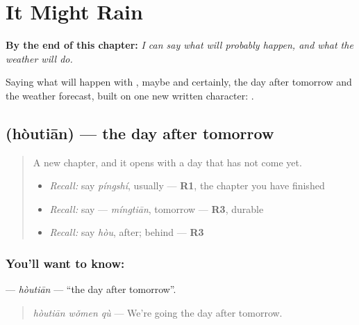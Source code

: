 
\chapter{It Might Rain}
\label{ch:zh-it-might-rain}

\begin{chapteropening}
\textbf{By the end of this chapter:} \emph{I can say what will probably happen, and what the weather will do.}

Saying what will happen with , maybe and certainly, the day after tomorrow and the weather forecast, built on one new written character: .
\end{chapteropening}

\section[\texorpdfstring{\zh{后天} (hòutiān)}{后天 (hòutiān)}]{ (hòutiān) — the day after tomorrow}

\label{lesson:ZH-C147-houtian}



\begin{quote}
A new chapter, and it opens with a day that has not come yet.

\begin{itemize}
\raggedright
  \item \emph{Recall:} say \emph{píngshí}, usually — \textbf{R1}, the chapter you have finished
  \item \emph{Recall:} say  — \emph{míngtiān}, tomorrow — \textbf{R3}, durable
  \item \emph{Recall:} say \emph{hòu}, after; behind — \textbf{R3}
\end{itemize}
\end{quote}

\subsection*{You'll want to know: }
\textbf{} — \emph{hòutiān} — \textquotedblleft{}the day after tomorrow\textquotedblright{}.

\begin{quote}
\textbf{} \emph{hòutiān wǒmen qù} — We're going the day after tomorrow.
\end{quote}

